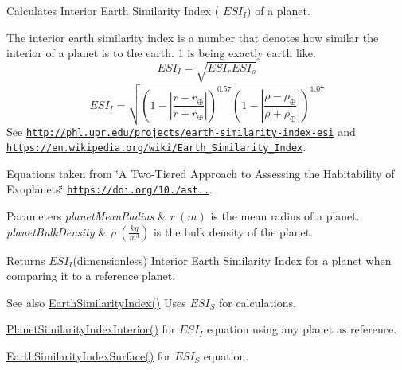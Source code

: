 Calculates Interior Earth Similarity Index ( $ESI_I)$ of a planet. 

The interior earth similarity index is a number that denotes how similar the interior of a planet is to the earth. 1 is being exactly earth like. \[ESI_I=\sqrt{ESI_r ESI_\rho}\] \[ESI_I=\sqrt{\left ( 1 - \left | \frac{r-r_\oplus}{r+r_\oplus} \right | \right )^{0.57} \left ( 1 - \left | \frac{\rho-\rho_\oplus}{\rho+\rho_\oplus} \right | \right )^{1.07}}\] See \href{http://phl.upr.edu/projects/earth-similarity-index-esi}{\tt http\+://phl.\+upr.\+edu/projects/earth-\/similarity-\/index-\/esi} and \href{https://en.wikipedia.org/wiki/Earth_Similarity_Index}{\tt https\+://en.\+wikipedia.\+org/wiki/\+Earth\+\_\+\+Similarity\+\_\+\+Index}.

Equations taken from \char`\"{}\+A Two-\/\+Tiered Approach to Assessing the Habitability of Exoplanets\char`\"{} \href{https://doi.org/10.1089/ast.2010.0592}{\tt https\+://doi.\+org/10./ast..}.


\begin{DoxyParams}{Parameters}
{\em planet\+Mean\+Radius} & $r\ (m)$ is the mean radius of a planet. \\
\hline
{\em planet\+Bulk\+Density} & $\rho\ (\frac{kg}{m^3})$ is the bulk density of the planet. \\
\hline
\end{DoxyParams}
\begin{DoxyReturn}{Returns}
$ESI_I$(dimensionless) Interior Earth Similarity Index for a planet when comparing it to a reference planet. 
\end{DoxyReturn}
\begin{DoxySeeAlso}{See also}
\hyperlink{group___astrophysics_ga4b86397b1c839c49ac599d49fda207d4}{Earth\+Similarity\+Index()} Uses $ESI_S$ for calculations. 

\hyperlink{group___astrophysics_ga6dc06a1a8baf6e132abed51fcf410c7f}{Planet\+Similarity\+Index\+Interior()} for $ESI_I$ equation using any planet as reference. 

\hyperlink{group___astrophysics_ga1df772b0ed354ca7f7e4a7a4af072325}{Earth\+Similarity\+Index\+Surface()} for $ESI_S$ equation. 
\end{DoxySeeAlso}
\mbox{\label{group___astrophysics_ga1df772b0ed354ca7f7e4a7a4af072325}} 
